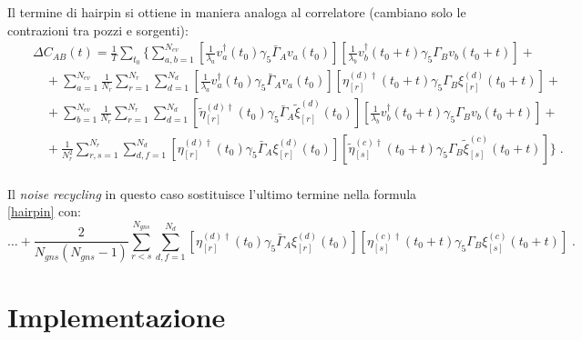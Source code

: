 \documentclass[a4paper]{article}
\newcommand{\point}{\; .}
\begin{document}
Il termine di hairpin si ottiene in maniera analoga al correlatore (cambiano solo le contrazioni tra pozzi e sorgenti):
\begin{eqnarray}
&& \Delta C_{AB}(t) = \frac{1}{T} \sum_{t_0} \Big\{
\sum_{a,b=1}^{N_{ev}}
\left[ \frac{1}{\lambda_a} v_a^\dagger(t_0) \gamma_5 \bar{\Gamma}_A v_a(t_0) \right]
\left[ \frac{1}{\lambda_b} v_b^\dagger(t_0+t) \gamma_5 \Gamma_B v_b(t_0+t) \right]
+ \nonumber \\
&& \quad + 
\sum_{a=1}^{N_{ev}} \frac{1}{N_r} \sum_{r=1}^{N_{r}} \sum_{d=1}^{N_{d}} 
\left[ \frac{1}{\lambda_a} v_a^\dagger(t_0) \gamma_5 \bar{\Gamma}_A v_a(t_0) \right]
\left[  \eta_{[r]}^{(d)\dagger}(t_0+t)\gamma_5 \Gamma_B \xi_{[r]}^{(d)}(t_0+t) \right]
+ \nonumber \\
&& \quad + 
\sum_{b=1}^{N_{ev}} \frac{1}{N_r} \sum_{r=1}^{N_{r}} \sum_{d=1}^{N_{d}}
\left[ \tilde{\eta}_{[r]}^{(d)\dagger}(t_0) \gamma_5 \bar{\Gamma}_A \tilde{\xi}_{[r]}^{(d)}(t_0) \right]
\left[ \frac{1}{\lambda_b} v_b^\dagger(t_0+t) \gamma_5 \Gamma_B v_b(t_0+t) \right]
+ \nonumber \\
&& \quad + 
\frac{1}{N_r^2} \sum_{r,s=1}^{N_{r}} \sum_{d,f=1}^{N_{d}}
\left[ \eta_{[r]}^{(d)\dagger}(t_0) \gamma_5 \bar{\Gamma}_A \xi_{[r]}^{(d)}(t_0) \right]
\left[ \tilde{\eta}_{[s]}^{(c)\dagger}(t_0+t) \gamma_5 \Gamma_B \tilde{\xi}_{[s]}^{(c)}(t_0+t) \right]
\Big\} \point \nonumber \\
&& \label{hairpin}
\end{eqnarray}

Il \textit{noise recycling} in questo caso sostituisce l'ultimo termine nella formula \ref{hairpin} con:
\begin{equation} \label{hairpin_with_nr}
\dots + \frac{2}{N_{gns} (N_{gns}-1)} \sum_{r<s}^{N_{gns}} \sum_{d,f=1}^{N_{d}}
\left[ \eta_{[r]}^{(d)\dagger}(t_0) \gamma_5 \bar{\Gamma}_A \xi_{[r]}^{(d)}(t_0) \right]
\left[ \eta_{[s]}^{(c)\dagger}(t_0+t) \gamma_5 \Gamma_B \xi_{[s]}^{(c)}(t_0+t) \right] \point
\end{equation}



\section{Implementazione}
\end{document}

